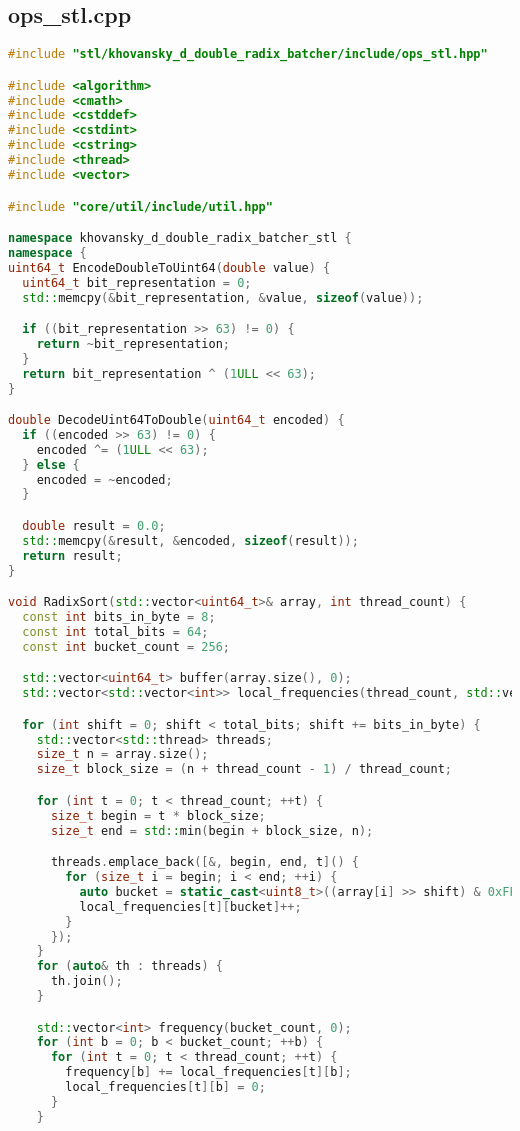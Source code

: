 \documentclass[12pt]{article}
\begin{document}
\subsection*{ops\_stl.cpp}
\begin{lstlisting}[language=C++,
    breaklines=true,       % Автоматический перенос строк
    columns=fullflexible ]
#include "stl/khovansky_d_double_radix_batcher/include/ops_stl.hpp"

#include <algorithm>
#include <cmath>
#include <cstddef>
#include <cstdint>
#include <cstring>
#include <thread>
#include <vector>

#include "core/util/include/util.hpp"

namespace khovansky_d_double_radix_batcher_stl {
namespace {
uint64_t EncodeDoubleToUint64(double value) {
  uint64_t bit_representation = 0;
  std::memcpy(&bit_representation, &value, sizeof(value));

  if ((bit_representation >> 63) != 0) {
    return ~bit_representation;
  }
  return bit_representation ^ (1ULL << 63);
}

double DecodeUint64ToDouble(uint64_t encoded) {
  if ((encoded >> 63) != 0) {
    encoded ^= (1ULL << 63);
  } else {
    encoded = ~encoded;
  }

  double result = 0.0;
  std::memcpy(&result, &encoded, sizeof(result));
  return result;
}

void RadixSort(std::vector<uint64_t>& array, int thread_count) {
  const int bits_in_byte = 8;
  const int total_bits = 64;
  const int bucket_count = 256;

  std::vector<uint64_t> buffer(array.size(), 0);
  std::vector<std::vector<int>> local_frequencies(thread_count, std::vector<int>(bucket_count, 0));

  for (int shift = 0; shift < total_bits; shift += bits_in_byte) {
    std::vector<std::thread> threads;
    size_t n = array.size();
    size_t block_size = (n + thread_count - 1) / thread_count;

    for (int t = 0; t < thread_count; ++t) {
      size_t begin = t * block_size;
      size_t end = std::min(begin + block_size, n);

      threads.emplace_back([&, begin, end, t]() {
        for (size_t i = begin; i < end; ++i) {
          auto bucket = static_cast<uint8_t>((array[i] >> shift) & 0xFF);
          local_frequencies[t][bucket]++;
        }
      });
    }
    for (auto& th : threads) {
      th.join();
    }

    std::vector<int> frequency(bucket_count, 0);
    for (int b = 0; b < bucket_count; ++b) {
      for (int t = 0; t < thread_count; ++t) {
        frequency[b] += local_frequencies[t][b];
        local_frequencies[t][b] = 0;
      }
    }


\end{lstlisting}
\end{document}
